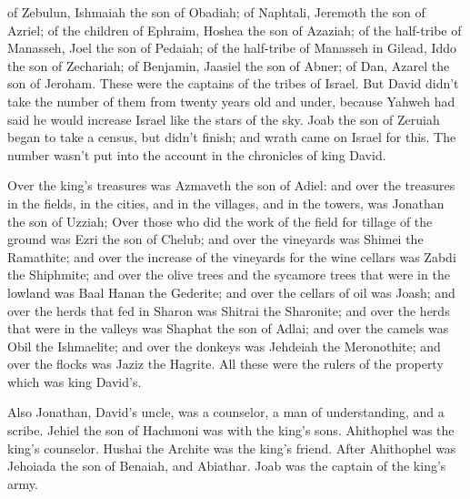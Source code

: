 {of Zebulun, Ishmaiah the son of Obadiah; of Naphtali, Jeremoth the son of Azriel;
of the children of Ephraim, Hoshea the son of Azaziah; of the half-tribe of Manasseh, Joel the son of Pedaiah;
of the half-tribe of Manasseh in Gilead, Iddo the son of Zechariah; of Benjamin, Jaasiel the son of Abner;
of Dan, Azarel the son of Jeroham. These were the captains of the tribes of Israel.
But David didn’t take the number of them from twenty years old and under, because Yahweh had said he would increase Israel like the stars of the sky.
Joab the son of Zeruiah began to take a census, but didn’t finish; and wrath came on Israel for this. The number wasn’t put into the account in the chronicles of king David.
\par }{\PP {}Over the king’s treasures was Azmaveth the son of Adiel: and over the treasures in the fields, in the cities, and in the villages, and in the towers, was Jonathan the son of Uzziah;
Over those who did the work of the field for tillage of the ground was Ezri the son of Chelub;
and over the vineyards was Shimei the Ramathite; and over the increase of the vineyards for the wine cellars was Zabdi the Shiphmite;
and over the olive trees and the sycamore trees that were in the lowland was Baal Hanan the Gederite; and over the cellars of oil was Joash;
and over the herds that fed in Sharon was Shitrai the Sharonite; and over the herds that were in the valleys was Shaphat the son of Adlai;
and over the camels was Obil the Ishmaelite; and over the donkeys was Jehdeiah the Meronothite; and over the flocks was Jaziz the Hagrite.
All these were the rulers of the property which was king David’s.
\par }{\PP {}Also Jonathan, David’s uncle, was a counselor, a man of understanding, and a scribe. Jehiel the son of Hachmoni was with the king’s sons.
Ahithophel was the king’s counselor. Hushai the Archite was the king’s friend.
After Ahithophel was Jehoiada the son of Benaiah, and Abiathar. Joab was the captain of the king’s army.

}
